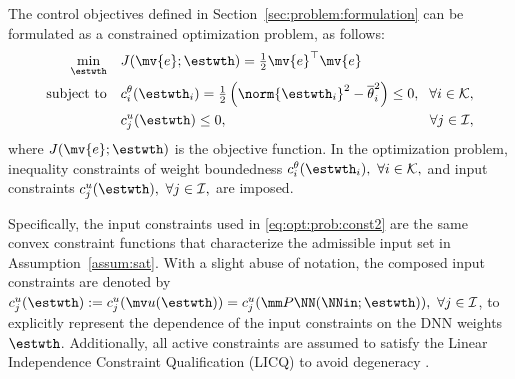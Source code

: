 \documentclass[letterpaper, journal]{IEEEtran}
\providecommand{\DIFdelbegin}{} %
\providecommand{\DIFdelend}{} %
\begin{document}
The control objectives defined in Section~\ref{sec:problem:formulation} can be formulated as a constrained optimization problem, as follows:
\begin{subequations} \label{eq:opt:prob} 
  \begin{align} 
    \min_{\estwth} \quad 
    & 
    J(\mv{e};\estwth)
    = 
    \tfrac{1}{2} \mv{e}^\top \mv{e} 
    &
    \label{eq:opt:prob:obj} 
    \\ 
    \text{subject to} \quad  
    & 
    c^{\theta}_i(\estwth_i)=\tfrac{1}{2}
    \left(
      \norm{\estwth_i}^2
      -
      \overline{\theta}_i^2 
    \right)
    \le 0, 
    \!
    &
    \!
    \forall i\in\mathcal{K} 
    ,
    \label{eq:opt:prob:const1} 
    \\ 
    & 
    c^{u}_j(\estwth)
    \le 0, 
    &
    \forall j\in\mathcal{I} 
    \label{eq:opt:prob:const2} 
    ,
  \end{align}%
\end{subequations}
where $J(\mv{e};\estwth)$ is the objective function.
In the optimization problem, inequality constraints of weight boundedness $c^{\theta}_i(\estwth_i),\ \forall i\in\mathcal{K},$ and input constraints $c^{u}_j(\estwth),\ \forall j\in\mathcal{I},$ are imposed.
\DIFdelbegin %
\DIFdelend 

Specifically, the input constraints used in \eqref{eq:opt:prob:const2} are the same convex constraint functions that characterize the admissible input set in Assumption~\ref{assum:sat}.
With a slight abuse of notation, the composed input constraints are denoted by
$c_j^u(\estwth):=c_j^u(\mv u(\estwth))=c_j^u(\mm P\NN(\NNin;\estwth)),\ \forall j\in\mathcal I$, to explicitly represent the dependence of the input constraints on the DNN weights $\estwth$.
Additionally, all active constraints are assumed to satisfy the Linear Independence Constraint Qualification (LICQ) to avoid degeneracy \cite[pp. 465--467]{Nocedal:2006aa}.
\end{document}
